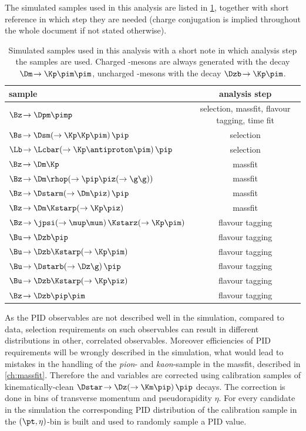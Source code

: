 The simulated samples used in this analysis are listed in \cref{tab:simSamples}, together with short reference in which step they are needed (charge conjugation is implied throughout the whole document if not stated otherwise).
\begin{table}[tbp]
	\centering
	\caption{Simulated samples used in this analysis with a short note in which analysis step the samples are used.
	Charged \D-mesons are always generated with the decay $\Dm\!\to\Kp\pim\pim$, uncharged \D-mesons with the decay $\Dzb\!\to\Kp\pim$.}
	\begin{tabular}{lc}
		\toprule
		sample & analysis step \\
		\midrule
		$\Bz\!\to\Dpm\pimp$ 														& selection, massfit, flavour tagging, time fit \\
		$\Bs\!\to\Dsm\!\left(\to\Kp\Kp\pim\right)\pip$  							& selection \\
		$\Lb\!\to\Lcbar\!\left(\to\Kp\antiproton\pim\right)\pip$ 					& selection \\
		$\Bz\!\to\Dm\Kp$ 															& massfit \\
		$\Bz\!\to\Dm\rhop\!\left(\to\pip\piz\!\left(\to\g\g\right)\right)$ 			& massfit \\
		$\Bz\!\to\Dstarm\!\left(\to\Dm\piz\right)\pip$ 								& massfit \\
		$\Bz\!\to\Dm\Kstarp\!\left(\to\Kp\piz\right)$ 								& massfit \\
		$\Bz\!\to\jpsi\!\left(\to\mup\mun\right)\Kstarz\!\left(\to\Kp\pim\right)$ 	& flavour tagging \\
		$\Bu\!\to\Dzb\pip$ 															& flavour tagging \\
		$\Bu\!\to\Dzb\Kstarp\!\left(\to\Kp\pim\right)$ 								& flavour tagging \\
		$\Bu\!\to\Dstarb\!\left(\to\Dz\g\right)\pip$ 								& flavour tagging \\
		$\Bu\!\to\Dzb\Kstarp\!\left(\to\Kp\piz\right)$ 								& flavour tagging \\
		$\Bz\!\to\Dzb\pip\pim$ 														& flavour tagging \\
		\bottomrule
	\end{tabular}
	\label{tab:simSamples}
\end{table}
As the PID observables are not described well in the simulation, compared to data, selection requirements on such observables can result in different distributions in other, correlated observables.
Moreover efficiencies of PID requirements will be wrongly described in the simulation, what would lead to mistakes in the handling of the \emph{pion}- and \emph{kaon}-sample in the massfit, described in \cref{ch:massfit}.
Therefore the \dllkpi and \dllppi variables are corrected using calibration samples of kinematically-clean $\Dstar\!\to\Dz\!\left(\to\Km\pip\right)\pip$ decays.
The correction is done in bins of transverse momentum \pt and pseudorapidity $\eta$.
For every candidate in the simulation the corresponding PID distribution of the calibration sample in the $(\pt,\eta)$-bin is built and used to randomly sample a PID value.

